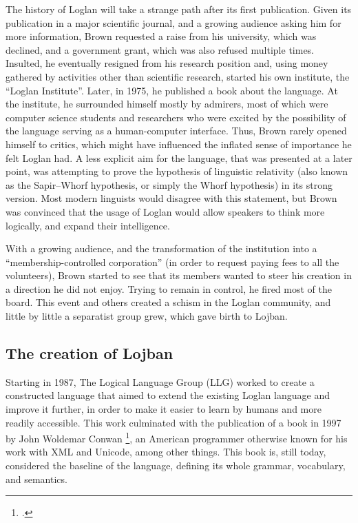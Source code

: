 The history of Loglan will take a strange path after its first publication. Given its publication in a major scientific journal, and a growing audience
asking him for more information, Brown requested a raise from his university, which was declined, and a government grant, which was also refused multiple times.
Insulted, he eventually resigned from his research position and, using money gathered by activities other than scientific research, started his own institute,
the ``Loglan Institute''. Later, in 1975, he published a book about the language. At the institute, he surrounded himself mostly by admirers, most of which were computer science
students and researchers who were excited by the possibility of the language serving as a human-computer interface. Thus, Brown rarely opened himself to critics,
which might have influenced the inflated sense of importance he felt Loglan had. A less explicit aim for the language, that was presented at a later point, was attempting
to prove the hypothesis of linguistic relativity (also known as the Sapir–Whorf hypothesis, or simply the Whorf hypothesis) in its strong version.
Most modern linguists would disagree with this statement, but Brown was convinced that the usage of Loglan would allow speakers to think more logically, and expand their
intelligence.\newline

With a growing audience, and the transformation of the institution into a ``membership-controlled corporation'' (in order to request paying fees to all the volunteers),
Brown started to see that its members wanted to steer his creation in a direction he did not enjoy. Trying to remain in control, he fired most of the board.
This event and others created a schism in the Loglan community, and little by little a separatist group grew, which gave birth to Lojban.

\subsection{The creation of Lojban}
\label{subsec:creation-of-lobjan}

Starting in 1987, The Logical Language Group (LLG) worked to create a constructed language that aimed to extend the existing Loglan language and improve it further,
in order to make it easier to learn by humans and more readily accessible. This work culminated with the publication of a book in 1997 by
John Woldemar Conwan \footcite{cowan1997complete}, an American programmer otherwise known for his work with XML and Unicode, among other things. This book is,
still today, considered the baseline of the language, defining its whole grammar, vocabulary, and semantics.\newline

